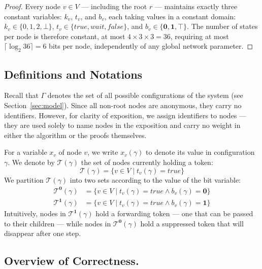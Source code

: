 \documentclass[a4paper, 12pt]{article}
\newcommand{\bz}{\mathbf{0}}
\newcommand{\bo}{\mathbf{1}}
\newcommand{\rk}{k}
\begin{document}
\begin{proof}
Every node $v \in V$ — including the root $r$ — maintains exactly three 
constant variables: $\rk_v$, $t_v$, and $b_v$, each taking values in a constant 
domain: $\rk_v \in \{0, 1, 2, \bot\}$, $t_v \in \{\mathit{true}, 
\mathit{wait}, \mathit{false}\}$, and $b_v \in \{\bz, \bo, \top\}$. 
The number of states per node is therefore constant, at most 
$4 \times 3 \times 3 = 36$, requiring at most 
$\lceil \log_2 36 \rceil = 6$ bits per node, independently of any 
global network parameter.
\end{proof}


\subsection{Definitions and Notations}

Recall that $\Gamma$ denotes the set of all possible configurations of 
the system (see Section~\ref{sec:model}). Since all non-root nodes are 
anonymous, they carry no identifiers. However, for clarity of exposition, 
we assign identifiers to nodes  — they are used solely to name nodes in the exposition and carry no 
weight in either the algorithm or the proofs themselves.

For a variable $x_v$ of node $v$, we write $x_v(\gamma)$ to denote its 
value in configuration $\gamma$. We denote by $\mathcal{T}(\gamma)$ the 
set of nodes currently holding a token:
\begin{equation}
    \mathcal{T}(\gamma) = \{v \in V \mid t_v(\gamma) = \mathit{true}\}
\end{equation}
We partition $\mathcal{T}(\gamma)$ into two sets according to the value 
of the bit variable:
\begin{align}
    \mathcal{T}^{\bz}(\gamma) &= \{v \in V \mid t_v(\gamma) = 
        \mathit{true} \wedge b_v(\gamma) = \bz\} \\
    \mathcal{T}^{\bo}(\gamma) &= \{v \in V \mid t_v(\gamma) = 
        \mathit{true} \wedge b_v(\gamma) = \bo\}
    \label{eq:T1}
\end{align}
Intuitively, nodes in $\mathcal{T}^{\bo}(\gamma)$ hold a forwarding 
token — one that can be passed to their children — while nodes in 
$\mathcal{T}^{\bz}(\gamma)$ hold a suppressed token that will 
disappear after one step.
\subsection{Overview of Correctness.}
\end{document}
